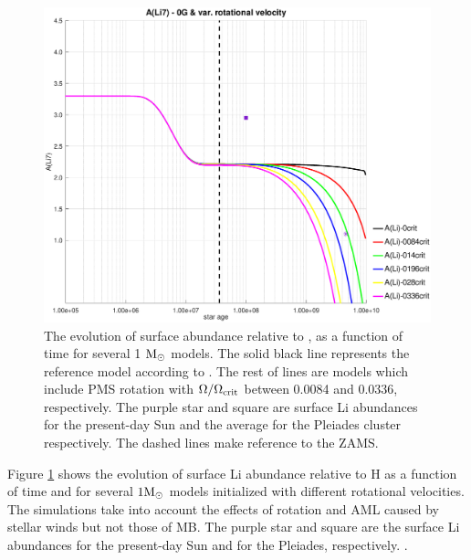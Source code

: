 \documentclass[fleqn,usenatbib]{mnras}
\begin{document}
\begin{figure}
	\includegraphics[trim = 35mm 15mm 20mm 15mm, clip, width=\columnwidth]{figures/li_var_vel_0_0g.eps}
    \caption{The evolution of surface  abundance relative to , as a function of time for several 1 $\mathrm{M}_\odot$ models. The solid black line represents the reference model according to \citet{Choi2016}. The rest of lines are models which include PMS rotation with $\Omega / \Omega_{\mathrm{crit}}$ between 0.0084 and 0.0336, respectively. The purple star and square are surface Li abundances for the present-day Sun \citep{Asplund2009} and the average for the Pleiades cluster \citep{Sestito2005} respectively. The dashed lines make reference to the ZAMS.}
    \label{fig:li_var_vel_0g}
\end{figure}

Figure \ref{fig:li_var_vel_0g} shows the evolution of surface Li abundance relative to H as a function of time and for several $1\mathrm{M}_\odot$ models initialized with different rotational velocities. The simulations take into account the effects of rotation and AML caused by stellar winds but not those of MB. The purple star and square are the surface Li abundances for the present-day Sun \citep{Asplund2009} and for the Pleiades, respectively.  \citep{Sestito2005}.\par
\end{document}
